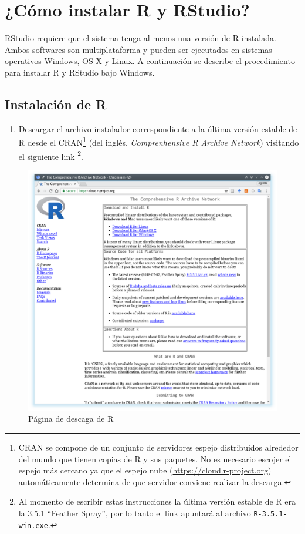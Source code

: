 \documentclass[a4paper]{book}
\providecommand{\tightlist}{%
  \setlength{\itemsep}{0pt}\setlength{\parskip}{0pt}}
\let\rmarkdownfootnote\footnote%
\def\footnote{\protect\rmarkdownfootnote}
\begin{document}
\hypertarget{como-instalar-r-y-rstudio-1}{%
\section{¿Cómo instalar R y
RStudio?}\label{como-instalar-r-y-rstudio-1}}

RStudio requiere que el sistema tenga al menos una versión de R
instalada. Ambos softwares son multiplataforma y pueden ser ejecutados
en sistemas operativos Windows, OS X y Linux. A continuación se describe
el procedimiento para instalar R y RStudio bajo Windows.

\hypertarget{instalacion-de-r-1}{%
\subsection{Instalación de R}\label{instalacion-de-r-1}}

\begin{enumerate}
\def\labelenumi{\arabic{enumi})}
\tightlist
\item
  Descargar el archivo instalador correspondiente a la última versión
  estable de R desde el CRAN\footnote{CRAN se compone de un conjunto de
    servidores espejo distribuidos alrededor del mundo que tienen copias
    de R y sus paquetes. No es necesario escojer el espejo más cercano
    ya que el espejo nube (\url{https://cloud.r-project.org})
    automáticamente determina de que servidor conviene realizar la
    descarga.} (del inglés, \emph{Comprenhensive R Archive Network})
  visitando el siguiente
  \href{https://cloud.r-project.org/bin/windows/base/release.htm}{link}
  \footnote{Al momento de escribir estas instrucciones la última versión
    estable de R era la 3.5.1 ``Feather Spray'', por lo tanto el link
    apuntará al archivo \texttt{R-3.5.1-win.exe}.}.
\end{enumerate}

\begin{figure}[h]

{\centering \includegraphics[width=0.75\linewidth,]{images/choose_OS} 

}

\caption{Página de descaga de R}\label{fig:unnamed-chunk-20}
\end{figure}
\end{document}
